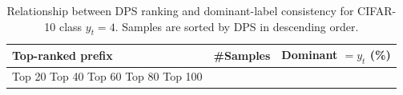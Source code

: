 \begin{table}[t]
\centering
\begin{tabular}{lrr}
\toprule
Top-ranked prefix & \#Samples & Dominant $= y_t$ (\%) \\
\midrule
Top 20%
Top 40%
Top 60%
Top 80%
Top 100%
\bottomrule
\caption{Relationship between DPS ranking and dominant-label consistency for CIFAR-10 class $y_t=4$. Samples are sorted by DPS in descending order.}
\label{tab:class_4_prefix}
\end{tabular}
\end{table}
